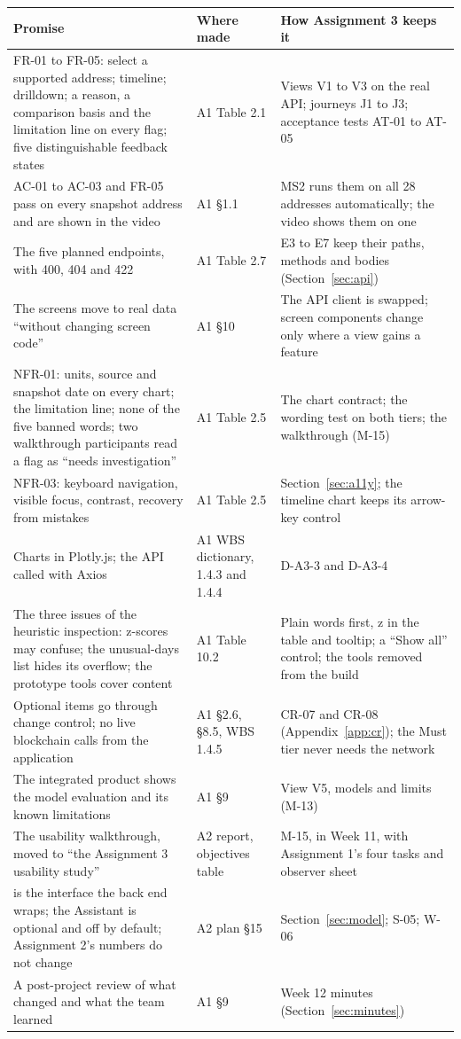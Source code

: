{\small
\begin{longtable}{@{}L{5.4cm}L{2.6cm}L{6.0cm}@{}}
\toprule
\textbf{Promise} & \textbf{Where made} & \textbf{How Assignment 3 keeps it} \\
\midrule
\endhead
FR-01 to FR-05: select a supported address; timeline; drilldown; a reason, a comparison basis and the limitation line on every flag; five distinguishable feedback states & A1 Table 2.1 & Views V1 to V3 on the real API; journeys J1 to J3; acceptance tests AT-01 to AT-05 \\
AC-01 to AC-03 and FR-05 pass on every snapshot address and are shown in the video & A1 §1.1 & MS2 runs them on all 28 addresses automatically; the video shows them on one \\
The five planned endpoints, with 400, 404 and 422 & A1 Table 2.7 & E3 to E7 keep their paths, methods and bodies (Section~\ref{sec:api}) \\
The screens move to real data ``without changing screen code'' & A1 §10 & The API client is swapped; screen components change only where a view gains a feature \\
NFR-01: units, source and snapshot date on every chart; the limitation line; none of the five banned words; two walkthrough participants read a flag as ``needs investigation'' & A1 Table 2.5 & The chart contract; the wording test on both tiers; the walkthrough (M-15) \\
NFR-03: keyboard navigation, visible focus, contrast, recovery from mistakes & A1 Table 2.5 & Section~\ref{sec:a11y}; the timeline chart keeps its arrow-key control \\
Charts in Plotly.js; the API called with Axios & A1 WBS dictionary, 1.4.3 and 1.4.4 & D-A3-3 and D-A3-4 \\
The three issues of the heuristic inspection: z-scores may confuse; the unusual-days list hides its overflow; the prototype tools cover content & A1 Table 10.2 & Plain words first, z in the table and tooltip; a ``Show all'' control; the tools removed from the build \\
Optional items go through change control; no live blockchain calls from the application & A1 §2.6, §8.5, WBS 1.4.5 & CR-07 and CR-08 (Appendix~\ref{app:cr}); the Must tier never needs the network \\
The integrated product shows the model evaluation and its known limitations & A1 §9 & View V5, models and limits (M-13) \\
The usability walkthrough, moved to ``the Assignment 3 usability study'' & A2 report, objectives table & M-15, in Week 11, with Assignment 1's four tasks and observer sheet \\
 is the interface the back end wraps; the Assistant is optional and off by default; Assignment 2's numbers do not change & A2 plan §15 & Section~\ref{sec:model}; S-05; W-06 \\
A post-project review of what changed and what the team learned & A1 §9 & Week 12 minutes (Section~\ref{sec:minutes}) \\
\bottomrule
\end{longtable}
}

